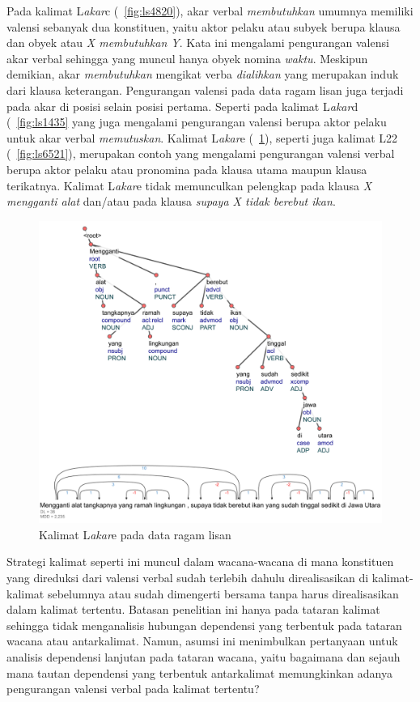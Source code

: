 Pada kalimat L\textit{akar}c (\pic~\ref{fig:ls4820}), akar verbal \textit{membutuhkan} umumnya memiliki valensi sebanyak dua konstituen, yaitu aktor pelaku atau subyek berupa klausa dan obyek atau \textit{X membutuhkan Y}. Kata ini mengalami pengurangan valensi akar verbal sehingga yang muncul hanya obyek nomina \textit{waktu}. Meskipun demikian, akar \textit{membutuhkan} mengikat verba \textit{dialihkan} yang merupakan induk dari klausa keterangan. Pengurangan valensi pada data ragam lisan juga terjadi pada akar di posisi selain posisi pertama. Seperti pada kalimat L\textit{akar}d (\pic~\ref{fig:ls1435} yang juga mengalami pengurangan valensi berupa aktor pelaku untuk akar verbal \textit{memutuskan}. Kalimat L\textit{akar}e (\pic~\ref{fig:ls1265}), seperti juga kalimat L22 (\pic~\ref{fig:ls6521}), merupakan contoh yang mengalami pengurangan valensi verbal berupa aktor pelaku atau pronomina pada klausa utama maupun klausa terikatnya. Kalimat L\textit{akar}e tidak memunculkan pelengkap pada klausa \textit{X mengganti alat} dan/atau pada klausa \textit{supaya X tidak berebut ikan}.

\begin{figure}
	\centering \includegraphics[width=0.9
	\textwidth] {pics/ls1265.jpg} 
	\caption{Kalimat L\textit{akar}e pada data ragam lisan}
	\label{fig:ls1265} 
\end{figure}

Strategi kalimat seperti ini muncul dalam wacana-wacana di mana konstituen yang direduksi dari valensi verbal sudah terlebih dahulu direalisasikan di kalimat-kalimat sebelumnya atau sudah dimengerti bersama tanpa harus direalisasikan dalam kalimat tertentu. Batasan penelitian ini hanya pada tataran kalimat sehingga tidak menganalisis hubungan dependensi yang terbentuk pada tataran wacana atau antarkalimat. Namun, asumsi ini menimbulkan pertanyaan untuk analisis dependensi lanjutan pada tataran wacana, yaitu bagaimana dan sejauh mana tautan dependensi yang terbentuk antarkalimat memungkinkan adanya pengurangan valensi verbal pada kalimat tertentu?

